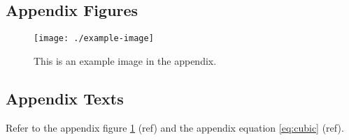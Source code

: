 \documentclass{article}
\begin{document}
\subsection{Appendix Figures}

\begin{figure}[H]
    \centering
    \texttt{[image: ./example-image]}
    \caption{This is an example image in the appendix.}
    \label{fig:appendix}
\end{figure}

\subsection{Appendix Texts}

Refer to the appendix figure \cref{fig:appendix} (ref) and the appendix equation \cref{eq:cubic} (ref).

\listoffigures

\listoftables
\end{document}
